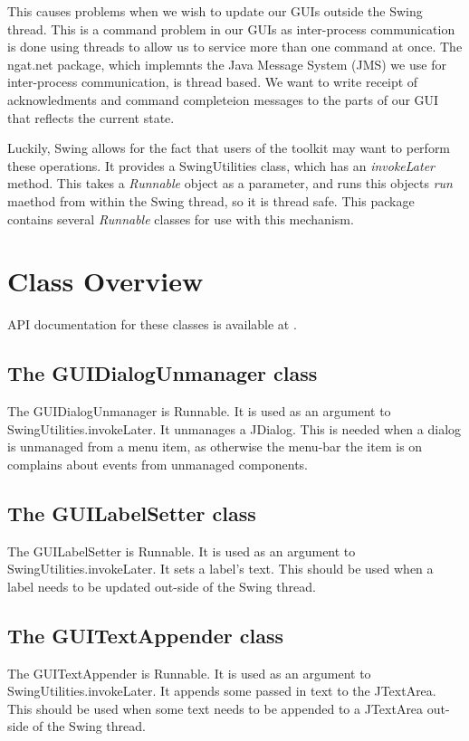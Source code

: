 \documentclass[10pt,a4paper]{article}
\begin{document}
This causes problems when we wish to update our GUIs outside the Swing thread. This is a command problem in our GUIs
as inter-process communication is done using threads to allow us to service more than one command at once. The ngat.net
package, which implemnts the Java Message System (JMS) we use for inter-process communication, is thread based. We
want to write receipt of acknowledments and command completeion messages to the parts of our GUI that
reflects the current state.

Luckily, Swing allows for the fact that users of the toolkit may want to perform these operations. It provides a 
SwingUtilities class, which has an {\em invokeLater} method. This takes a {\em Runnable} object as a parameter,
and runs this objects {\em run} maethod from within the Swing thread, so it is thread safe. This package contains
several {\em Runnable} classes for use with this mechanism.

\section{Class Overview}
API documentation for these classes is available at \cite{bib:ngatswingtree}.

\subsection{The GUIDialogUnmanager class}
The GUIDialogUnmanager is Runnable. It is used as an argument to SwingUtilities.invokeLater.
It unmanages a JDialog. This is needed when a dialog is unmanaged from a menu item, as otherwise
the menu-bar the item is on complains about events from unmanaged components.

\subsection{The GUILabelSetter class}
The GUILabelSetter is Runnable. It is used as an argument to SwingUtilities.invokeLater.
It sets a label's text. This should be used when a label needs to be updated out-side of the Swing
thread.

\subsection{The GUITextAppender class}
The GUITextAppender is Runnable. It is used as an argument to SwingUtilities.invokeLater.
It appends some passed in text to the JTextArea. This should be used when some text needs to
be appended to a JTextArea out-side of the Swing thread.
\end{document}
